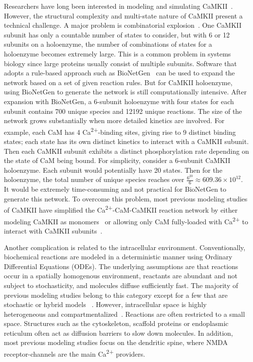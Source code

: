\documentclass[10pt,letterpaper]{article}
\begin{document}
Researchers have long been interested in modeling and simulating CaMKII~\cite{Zhabotinsky:2000fp,Holmes:2000uk,Kubota:2001ul,Dupont:2003vq,Bhalla:2004cu,Lucic:2008gt,Zeng:2010bq,Pepke:2010ju,Michalski:2012ds}. However, the structural complexity and multi-state nature of CaMKII present a technical challenge. A major problem is combinatorial explosion~\cite{Stefan:2014gl}. One CaMKII subunit has only a countable number of states to consider, but with 6 or 12 subunits on a holoenzyme, the number of combinations of states for a holoenzyme becomes extremely large. This is a common problem in systems biology since large proteins usually consist of multiple subunits. Software that adopts a rule-based approach such as BioNetGen~\cite{Hlavacek:2006iq} can be used to expand the network based on a set of given reaction rules. But for CaMKII holoenzyme, using BioNetGen to generate the network is still computationally intensive. After expansion with BioNetGen, a 6-subunit holoenzyme with four states for each subunit contains 700 unique species and 12192 unique reactions. The size of the network grows substantially when more detailed kinetics are involved. For example, each CaM has 4 Ca\textsuperscript{2+}-binding sites, giving rise to 9 distinct binding states; each state has its own distinct kinetics to interact with a CaMKII subunit. Then each CaMKII subunit exhibits a distinct phosphorylation rate depending on the state of CaM being bound. For simplicity, consider a 6-subunit CaMKII holoenzyme. Each subunit would potentially have 20 states. Then for the holoenzyme, the total number of unique species reaches over $\frac{6^{20}}{6} \approx 609.36\times10^{12}$. It would be extremely time-consuming and not practical for BioNetGen to generate this network. To overcome this problem, most previous modeling studies of CaMKII have simplified the Ca\textsuperscript{2+}-CaM-CaMKII reaction network by either modeling CaMKII as monomers~\cite{Bhalla:2004cu,Pepke:2010ju} or allowing only CaM fully-loaded with Ca\textsuperscript{2+} to interact with CaMKII subunits~\cite{Zhabotinsky:2000fp,Kubota:2001ul,Dupont:2003vq,Michalski:2012ds}.

Another complication is related to the intracellular environment. Conventionally, biochemical reactions are modeled in a deterministic manner using Ordinary Differential Equations (ODEs). The underlying assumptions are that reactions occur in a spatially homogenous environment, reactants are abundant and not subject to stochasticity, and molecules diffuse sufficiently fast. The majority of previous modeling studies belong to this category except for a few that are stochastic or hybrid models ~\cite{Bhalla:2004cu, Zeng:2010bq, Holmes:2000uk}. However, intracellular space is highly heterogeneous and compartmentalized~\cite{LubyPhelps:2000uj,Dix:2008gy}. Reactions are often restricted to a small space. Structures such as the cytoskeleton, scaffold proteins or endoplasmic reticulum often act as diffusion barriers to slow down molecules. In addition, most previous modeling studies focus on the dendritic spine, where NMDA receptor-channels are the main Ca\textsuperscript{2+} providers. 
\end{document}
